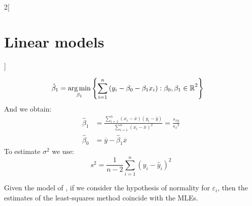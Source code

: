 \documentclass[../../../main_math.tex]{subfiles}
\begin{document}
\begin{multicols}{2}[\section{Linear models}]
\begin{proposition}
\begin{align*}
      \hat\beta_1 & =\operatorname*{arg\,min}_{\beta_1}\left\{\sum_{i=1}^n{(y_i-\beta_0-\beta_1x_i):\beta_0,\beta_1\in\mathbb{R}}^2\right\}
    \end{align*}
    And we obtain:
    \begin{align*}
      \hat\beta_1 & =\frac{\sum_{i=1}^n(x_i-\overline{x})(y_i-\overline{y})}{\sum_{i=1}^n{(x_i-\overline{x})}^2}=\frac{s_{xy}}{{s_x}^2} \\
      \hat\beta_0 & =\overline{y}-\hat\beta_1\overline{x}
    \end{align*}
    To estimate $\sigma^2$ we use: $$s^2=\frac{1}{n-2}\sum_{i=1}^n{(y_i-\hat{y}_i)}^2$$
  \end{proposition}
  \begin{theorem}
    Given the model of , if we consider the hypothesis of normality for $\varepsilon_i$, then the estimates of the least-squares method coincide with the MLEs.
  \end{theorem}


\end{multicols}
\end{document}
